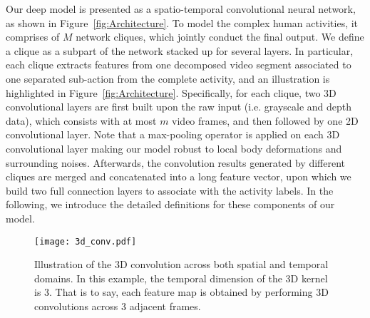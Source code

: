 \documentclass{sig-alternate}
\begin{document}
Our deep model is presented as a spatio-temporal convolutional neural network, as shown in Figure~\ref{fig:Architecture}. To model the complex human activities, it comprises of $M$ network cliques, which jointly conduct the final output. We define a clique as a subpart of the network stacked up for several layers. In particular, each clique extracts features from one decomposed video segment associated to one separated sub-action from the complete activity, and an illustration is highlighted in Figure~\ref{fig:Architecture}. Specifically, for each clique, two 3D convolutional layers are first built upon the raw input (i.e. grayscale and depth data), which consists with at most $m$ video frames, and then followed by one 2D convolutional layer. Note that a max-pooling operator is applied on each 3D convolutional layer making our model robust to local body deformations and surrounding noises.  Afterwards, the convolution results generated by different cliques are merged and concatenated into a long feature vector, upon which we build two full connection layers to associate with the activity labels.  In the following, we introduce the detailed definitions for these components of our model.


\begin{figure}[!ht]
\centering
\texttt{[image: 3d\_conv.pdf]}
\caption{Illustration of the 3D convolution across both spatial and temporal domains. In this example, the temporal dimension of the 3D kernel is 3. That is to say, each feature map is obtained by performing 3D convolutions across 3 adjacent frames.}\label{fig:conv3d}
\end{figure}
\end{document}
